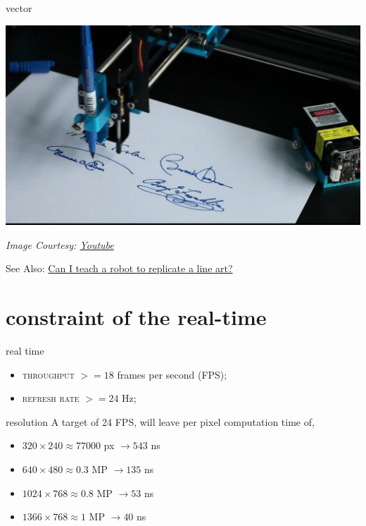 \documentclass[aspectratio=169,xcolor={dvipsnames,svgnames}]{beamer}
\begin{document}
\begin{frame}[label={sec:org6d0f03b}]{vector}
\centering

\begin{center}
\includegraphics[width=0.6\linewidth]{images/plotter.jpg}
\end{center}
\tiny \emph{Image Courtesy: \href{https://i.ytimg.com/vi/3ohDaX4uxKY/maxresdefault.jpg}{Youtube}}

See Also: \href{https://youtu.be/nMt5Dw04XhY}{Can I teach a robot to replicate a line art?}
\cite{VKN20}
\end{frame}

\section{constraint of the real-time}
\label{sec:orgbe34db1}

\begin{frame}[label={sec:org6552c20}]{real time}
\begin{itemize}
\item \alert{\textsc{throughput}} \(>=18\) frames per second (FPS);
\item \alert{\textsc{refresh rate}} \(>=24\) Hz;
\end{itemize}
\end{frame}

\begin{frame}[label={sec:orgeddca05}]{resolution}
A target of 24 FPS, will leave per pixel computation
time of,

\begin{itemize}
\item \(320\times240\approx77000\) px \(\to 543\) ns
\item \(640\times480\approx0.3\) MP \(\to 135\) ns
\item \(1024\times768\approx0.8\) MP \(\to 53\) ns
\item \(1366\times768\approx1\) MP \(\to 40\) ns
\end{itemize}
\end{frame}
\end{document}
